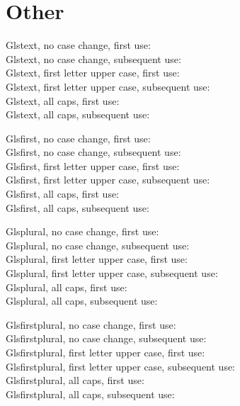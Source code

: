 \documentclass[10pt,noprint,nocopyright]{uit-thesis-test}
\begin{document}
\section{Other}
Glstext, no case change, first use: \\
Glstext, no case change, subsequent use: \\
Glstext, first letter upper case, first use: \\
Glstext, first letter upper case, subsequent use: \\
Glstext, all caps, first use: \\
Glstext, all caps, subsequent use: 

Glsfirst, no case change, first use: \\
Glsfirst, no case change, subsequent use: \\
Glsfirst, first letter upper case, first use: \\
Glsfirst, first letter upper case, subsequent use: \\
Glsfirst, all caps, first use: \\
Glsfirst, all caps, subsequent use: 

Glsplural, no case change, first use: \\
Glsplural, no case change, subsequent use: \\
Glsplural, first letter upper case, first use: \\
Glsplural, first letter upper case, subsequent use: \\
Glsplural, all caps, first use: \\
Glsplural, all caps, subsequent use: 

Glsfirstplural, no case change, first use: \\
Glsfirstplural, no case change, subsequent use: \\
Glsfirstplural, first letter upper case, first use: \\
Glsfirstplural, first letter upper case, subsequent use: \\
Glsfirstplural, all caps, first use: \\
Glsfirstplural, all caps, subsequent use: 
\end{document}
